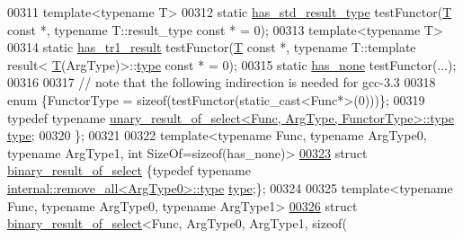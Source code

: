 \begin{DoxyCode}
00311     \textcolor{keyword}{template}<\textcolor{keyword}{typename} T>
00312     \textcolor{keyword}{static} \hyperlink{struct_eigen_1_1internal_1_1has__std__result__type}{has\_std\_result\_type}    testFunctor(\hyperlink{group___sparse_core___module}{T} \textcolor{keyword}{const} *, \textcolor{keyword}{typename} T::result\_type \textcolor{keyword}{const} 
      * = 0);
00313     \textcolor{keyword}{template}<\textcolor{keyword}{typename} T>
00314     \textcolor{keyword}{static} \hyperlink{struct_eigen_1_1internal_1_1has__tr1__result}{has\_tr1\_result}         testFunctor(\hyperlink{group___sparse_core___module}{T} \textcolor{keyword}{const} *, \textcolor{keyword}{typename} T::template result<
      \hyperlink{group___sparse_core___module}{T}(ArgType)>::\hyperlink{group___sparse_core___module}{type} \textcolor{keyword}{const} * = 0);
00315     \textcolor{keyword}{static} \hyperlink{struct_eigen_1_1internal_1_1has__none}{has\_none}               testFunctor(...);
00316 
00317     \textcolor{comment}{// note that the following indirection is needed for gcc-3.3}
00318     \textcolor{keyword}{enum} \{FunctorType = \textcolor{keyword}{sizeof}(testFunctor(static\_cast<Func*>(0)))\};
00319     \textcolor{keyword}{typedef} \textcolor{keyword}{typename} \hyperlink{group___sparse_core___module}{unary\_result\_of\_select<Func, ArgType, FunctorType>::type}
       \hyperlink{group___sparse_core___module}{type};
00320 \};
00321 
00322 \textcolor{keyword}{template}<\textcolor{keyword}{typename} Func, \textcolor{keyword}{typename} ArgType0, \textcolor{keyword}{typename} ArgType1, \textcolor{keywordtype}{int} SizeOf=sizeof(has\_none)>
\hyperlink{struct_eigen_1_1internal_1_1binary__result__of__select}{00323} \textcolor{keyword}{struct }\hyperlink{struct_eigen_1_1internal_1_1binary__result__of__select}{binary\_result\_of\_select} \{\textcolor{keyword}{typedef} \textcolor{keyword}{typename} 
      \hyperlink{group___sparse_core___module}{internal::remove\_all<ArgType0>::type} \hyperlink{group___sparse_core___module}{type};\};
00324 
00325 \textcolor{keyword}{template}<\textcolor{keyword}{typename} Func, \textcolor{keyword}{typename} ArgType0, \textcolor{keyword}{typename} ArgType1>
\hyperlink{struct_eigen_1_1internal_1_1binary__result__of__select_3_01_func_00_01_arg_type0_00_01_arg_type12f7b681b9b0e96643c5ba0b38cf06652}{00326} \textcolor{keyword}{struct }\hyperlink{struct_eigen_1_1internal_1_1binary__result__of__select}{binary\_result\_of\_select}<Func, ArgType0, ArgType1, sizeof(

\end{DoxyCode}
